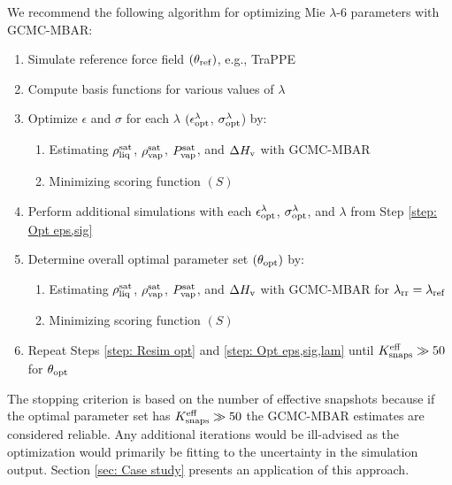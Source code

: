\documentclass[journal=jced,manuscript=article]{achemso}
\begin{document}
We recommend the following algorithm for optimizing Mie $\lambda$-6 parameters with GCMC-MBAR:
\begin{enumerate}
	\item Simulate reference force field $(\theta_{\rm ref})$, e.g., TraPPE \label{step: Sim ref}
	\item Compute basis functions for various values of $\lambda$ \label{step: Basis Functions}
	\item Optimize $\epsilon$ and $\sigma$ for each $\lambda$ $(\epsilon_{\rm opt}^\lambda$, $\sigma_{\rm opt}^\lambda$) by: \label{step: Opt eps,sig}
	\begin{enumerate}
		\item Estimating $\rho_{\rm liq}^{\rm sat}$, $\rho_{\rm vap}^{\rm sat}$, $P_{\rm vap}^{\rm sat}$, and $\Delta H_{\rm v}$ with GCMC-MBAR
		\item Minimizing scoring function $(S)$
	\end{enumerate}
	\item Perform additional simulations with each $\epsilon_{\rm opt}^\lambda$, $\sigma_{\rm opt}^\lambda$, and $\lambda$ from Step \ref{step: Opt eps,sig} \label{step: Resim opt}
	\item Determine overall optimal parameter set $(\theta_{\rm opt})$ by: \label{step: Opt eps,sig,lam}
	\begin{enumerate}
		\item Estimating $\rho_{\rm liq}^{\rm sat}$, $\rho_{\rm vap}^{\rm sat}$, $P_{\rm vap}^{\rm sat}$, and $\Delta H_{\rm v}$ with GCMC-MBAR for $\lambda_{\rm rr} = \lambda_{\rm ref}$
		\item Minimizing scoring function $(S)$
	\end{enumerate}
	\item Repeat Steps \ref{step: Resim opt} and \ref{step: Opt eps,sig,lam} until $K_{\rm snaps}^{\rm eff} \gg 50$ for $\theta_{\rm opt}$ 
\end{enumerate}
The stopping criterion is based on the number of effective snapshots because if the optimal parameter set has $K_{\rm snaps}^{\rm eff} \gg 50$ the GCMC-MBAR estimates are considered reliable. Any additional iterations would be ill-advised as the optimization would primarily be fitting to the uncertainty in the simulation output.
Section \ref{sec: Case study} presents an application of this approach.
\end{document}

